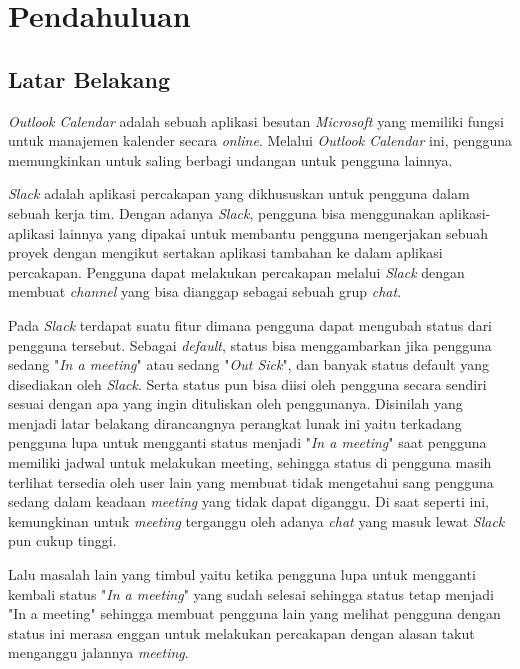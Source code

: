 \chapter{Pendahuluan}
\label{chap:intro}
   
\section{Latar Belakang}
\label{sec:label}

\textit{Outlook Calendar} adalah sebuah aplikasi besutan \textit{Microsoft} yang memiliki fungsi untuk manajemen kalender secara \textit{online}. Melalui \textit{Outlook Calendar} ini, pengguna memungkinkan untuk saling berbagi undangan untuk pengguna lainnya.  

\textit{Slack} adalah aplikasi percakapan yang dikhususkan untuk pengguna dalam sebuah kerja tim. Dengan adanya \textit{Slack}, pengguna bisa menggunakan aplikasi- aplikasi lainnya yang dipakai untuk membantu pengguna mengerjakan sebuah proyek dengan mengikut sertakan aplikasi tambahan ke dalam aplikasi percakapan. Pengguna dapat melakukan percakapan melalui \textit{Slack} dengan membuat \textit{channel} yang bisa dianggap sebagai sebuah grup \textit{chat}.

Pada \textit{Slack} terdapat suatu fitur dimana pengguna dapat mengubah status dari pengguna tersebut. Sebagai \textit{default}, status bisa menggambarkan jika pengguna sedang "\textit{In a meeting}" atau sedang "\textit{Out Sick}", dan banyak status default yang disediakan oleh \textit{Slack}. Serta status pun bisa diisi oleh pengguna secara sendiri sesuai dengan apa yang ingin dituliskan oleh penggunanya. Disinilah yang menjadi latar belakang dirancangnya perangkat lunak ini yaitu terkadang pengguna lupa untuk mengganti status menjadi "\textit{In a meeting}" saat pengguna memiliki jadwal untuk melakukan meeting, sehingga status di pengguna masih terlihat tersedia oleh user lain yang membuat tidak mengetahui sang pengguna sedang dalam keadaan \textit{meeting} yang tidak dapat diganggu. Di saat seperti ini, kemungkinan untuk \textit{meeting} terganggu oleh adanya \textit{chat} yang masuk lewat \textit{Slack} pun cukup tinggi. 

Lalu masalah lain yang timbul yaitu ketika pengguna lupa untuk mengganti kembali status "\textit{In a meeting}" yang sudah selesai sehingga status tetap menjadi "In a meeting" sehingga membuat pengguna lain yang melihat pengguna dengan status ini merasa enggan untuk melakukan percakapan dengan alasan takut menganggu jalannya \textit{meeting}. 

